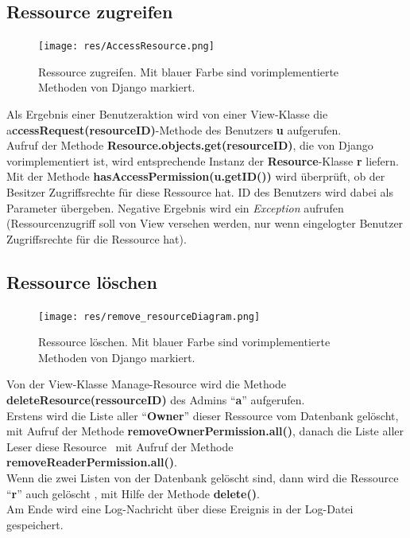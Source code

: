 \documentclass[parskip=full,11pt]{scrartcl}
\begin{document}
 \subsection{Ressource zugreifen}
 \begin{figure}[ht!]
 	\centering
 	\texttt{[image: res/AccessResource.png]}
 	\caption{Ressource zugreifen. Mit blauer Farbe sind vorimplementierte Methoden von Django markiert.}
 \end{figure}
 
Als Ergebnis einer Benutzeraktion wird von einer View-Klasse die a\textbf{ccessRequest(resourceID)}-Methode des Benutzers \textbf{u} aufgerufen.\\
Aufruf der Methode \textbf{Resource.objects.get(resourceID)}, die von Django vorimplementiert ist, wird entsprechende Instanz der \textbf{Resource}-Klasse \textbf{r} liefern.\\
Mit der Methode\textbf{ hasAccessPermission(u.getID())} wird überprüft, ob der Besitzer Zugriffsrechte für diese Ressource hat. ID des Benutzers wird dabei als Parameter übergeben. Negative Ergebnis wird ein \textit{Exception} aufrufen (Ressourcenzugriff soll von View versehen werden, nur wenn eingelogter Benutzer Zugriffsrechte für die Ressource hat).
 
 
 \newpage
 
 \subsection{Ressource löschen}
 \begin{figure}[ht!]
 	\centering
 	\texttt{[image: res/remove\_resourceDiagram.png]}
 	\caption{Ressource löschen. Mit blauer Farbe sind vorimplementierte Methoden von Django markiert.}
 \end{figure}
 
 
Von der View-Klasse Manage-Resource wird die Methode \textbf{deleteResource(ressourceID)} des Admins \enquote{\textbf{a}}  aufgerufen.\\ Erstens wird die Liste aller \enquote{\textbf{Owner}} dieser Ressource vom Datenbank gelöscht, mit Aufruf der Methode \textbf{removeOwnerPermission.all()}, danach die Liste aller Leser diese Resource \ mit Aufruf der Methode \textbf{removeReaderPermission.all()}.\\
Wenn die zwei Listen von der Datenbank gelöscht sind, dann wird die Ressource \enquote{\textbf{r}} auch gelöscht , mit Hilfe der Methode \textbf{delete()}.\\ Am Ende wird eine Log-Nachricht über diese Ereignis  in der Log-Datei gespeichert.\\
 
\end{document}
